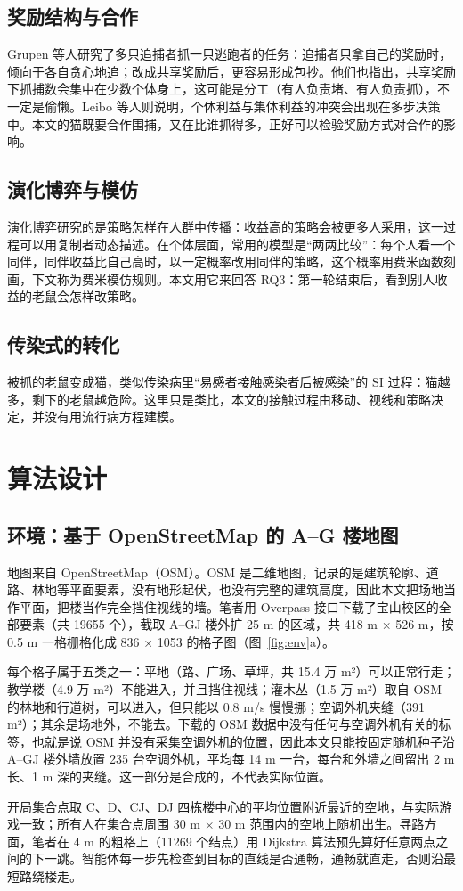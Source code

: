 \subsection{奖励结构与合作}
Grupen 等人研究了多只追捕者抓一只逃跑者的任务\cite{grupen2022}：追捕者只拿自己的奖励时，倾向于各自贪心地追；改成共享奖励后，更容易形成包抄。他们也指出，共享奖励下抓捕数会集中在少数个体身上，这可能是分工（有人负责堵、有人负责抓），不一定是偷懒。Leibo 等人则说明，个体利益与集体利益的冲突会出现在多步决策中\cite{leibo2017}。本文的猫既要合作围捕，又在比谁抓得多，正好可以检验奖励方式对合作的影响。

\subsection{演化博弈与模仿}
演化博弈研究的是策略怎样在人群中传播：收益高的策略会被更多人采用，这一过程可以用复制者动态描述\cite{taylor1978}。在个体层面，常用的模型是“两两比较”：每个人看一个同伴，同伴收益比自己高时，以一定概率改用同伴的策略，这个概率用费米函数刻画，下文称为费米模仿规则\cite{szabo1998,traulsen2006}。本文用它来回答 RQ3：第一轮结束后，看到别人收益的老鼠会怎样改策略。

\subsection{传染式的转化}
被抓的老鼠变成猫，类似传染病里“易感者接触感染者后被感染”的 SI 过程\cite{kermack1927}：猫越多，剩下的老鼠越危险。这里只是类比，本文的接触过程由移动、视线和策略决定，并没有用流行病方程建模。

\section{算法设计}
\subsection{环境：基于 OpenStreetMap 的 A–G 楼地图}
地图来自 OpenStreetMap（OSM）\cite{osm}。OSM 是二维地图，记录的是建筑轮廓、道路、林地等平面要素，没有地形起伏，也没有完整的建筑高度，因此本文把场地当作平面，把楼当作完全挡住视线的墙。笔者用 Overpass 接口下载了宝山校区的全部要素（共 19655 个），截取 A–GJ 楼外扩 25 m 的区域，共 418 m × 526 m，按 0.5 m 一格栅格化成 836 × 1053 的格子图（图~\ref{fig:env}a）。

每个格子属于五类之一：平地（路、广场、草坪，共 15.4 万 m²）可以正常行走；教学楼（4.9 万 m²）不能进入，并且挡住视线；灌木丛（1.5 万 m²）取自 OSM 的林地和行道树，可以进入，但只能以 0.8 m/s 慢慢挪；空调外机夹缝（391 m²）；其余是场地外，不能去。下载的 OSM 数据中没有任何与空调外机有关的标签，也就是说 OSM 并没有采集空调外机的位置，因此本文只能按固定随机种子沿 A–GJ 楼外墙放置 235 台空调外机，平均每 14 m 一台，每台和外墙之间留出 2 m 长、1 m 深的夹缝。这一部分是合成的，不代表实际位置。

开局集合点取 C、D、CJ、DJ 四栋楼中心的平均位置附近最近的空地，与实际游戏一致；所有人在集合点周围 30 m × 30 m 范围内的空地上随机出生。寻路方面，笔者在 4 m 的粗格上（11269 个结点）用 Dijkstra 算法预先算好任意两点之间的下一跳。智能体每一步先检查到目标的直线是否通畅，通畅就直走，否则沿最短路绕楼走。
